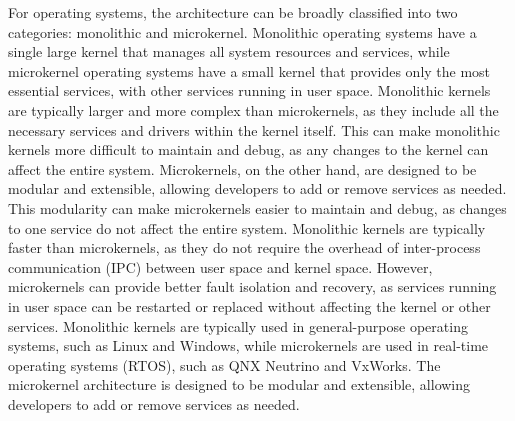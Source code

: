 \documentclass{article}
\begin{document}
For operating systems, the architecture can be broadly classified into two categories: monolithic and microkernel.
Monolithic operating systems have a single large kernel that manages all system resources and services, while microkernel operating systems have a small kernel that provides only the most essential services, with other services running in user space.
Monolithic kernels are typically larger and more complex than microkernels, as they include all the necessary services and drivers within the kernel itself.
This can make monolithic kernels more difficult to maintain and debug, as any changes to the kernel can affect the entire system.
Microkernels, on the other hand, are designed to be modular and extensible, allowing developers to add or remove services as needed.
This modularity can make microkernels easier to maintain and debug, as changes to one service do not affect the entire system.
Monolithic kernels are typically faster than microkernels, as they do not require the overhead of inter-process communication (IPC) between user space and kernel space.
However, microkernels can provide better fault isolation and recovery, as services running in user space can be restarted or replaced without affecting the kernel or other services.
Monolithic kernels are typically used in general-purpose operating systems, such as Linux and Windows, while microkernels are used in real-time operating systems (RTOS), such as QNX Neutrino and VxWorks.
The microkernel architecture is designed to be modular and extensible, allowing developers to add or remove services as needed.
\end{document}
